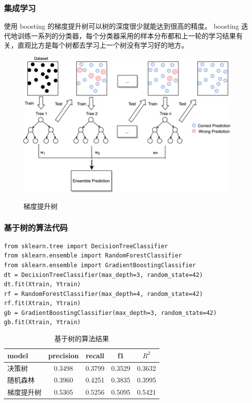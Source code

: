 \begin{frame}
    \frametitle{集成学习}
    使用 boosting 的梯度提升树可以树的深度很少就能达到很高的精度。
    boosting 迭代地训练一系列的分类器，每个分类器采用的样本分布都和上一轮的学习结果有关，直观比方是每个树都去学习上一个树没有学习好的地方。
    \begin{center}
        \begin{figure}
            \includegraphics[width=0.6\linewidth]{../lib/boosting.png}
            \label{boosting}
            \caption{梯度提升树}
        \end{figure}
    \end{center}
\end{frame}
\begin{frame}[fragile]
    \frametitle{基于树的算法代码}
    \begin{verbatim}
from sklearn.tree import DecisionTreeClassifier
from sklearn.ensemble import RandomForestClassifier
from sklearn.ensemble import GradientBoostingClassifier
dt = DecisionTreeClassifier(max_depth=3, random_state=42)
dt.fit(Xtrain, Ytrain)
rf = RandomForestClassifier(max_depth=4, random_state=42)
rf.fit(Xtrain, Ytrain)
gb = GradientBoostingClassifier(max_depth=3, random_state=42)
gb.fit(Xtrain, Ytrain)
    \end{verbatim}
    \begin{table}
        \caption{基于树的算法结果}
        \begin{tabular}{l|cccc}
            model & precision & recall & f1     & \(R^2\) \\ \hline
            决策树   & 0.3498    & 0.3799 & 0.3529 & 0.3632  \\
            随机森林  & 0.3960    & 0.4251 & 0.3835 & 0.3995  \\
            梯度提升树 & 0.5305    & 0.5256 & 0.5095 & 0.5421  \\
        \end{tabular}
        \label{trees}
    \end{table}
\end{frame}

